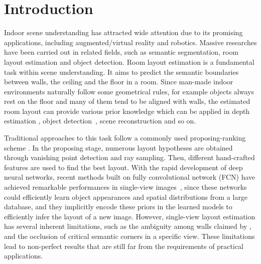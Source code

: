 \section{Introduction}

Indoor scene understanding has attracted wide attention due to its promising applications, including augmented/virtual reality and robotics. Massive researches have been carried out in related fields, such as semantic segmentation, room layout estimation and object detection. 
Room layout estimation is a fundamental task within scene understanding. It aims to predict the semantic boundaries between walls, the ceiling and the floor in a room. 
Since man-made indoor environments naturally follow some geometrical rules, for example objects always rest on the floor and many of them tend to be aligned with walls, the estimated room layout can provide various prior knowledge which can be applied in depth estimation \cite{eigen2014depth}, object detection~\cite{hedau2010thinking}, scene reconstruction \cite{lee2017joint} and so on.

Traditional approaches to this task follow a commonly used proposing-ranking scheme \cite{hedau2009recovering,wang2013discriminative,gupta2010estimating,hedau2010thinking}. In the proposing stage, numerous layout hypotheses are obtained through vanishing point detection and ray sampling. Then, different hand-crafted features are used to find the best layout. 
With the rapid development of deep neural networks, recent methods built on fully convolutional network (FCN) have achieved remarkable performances in single-view images~\cite{mallya2015learning,dasgupta2016delay,ren2016coarse,zhao2017physics,LeeRoomNet17,ICIP2018}, since these networks could efficiently learn object appearances and spatial distributions from a large database, and they implicitly encode these priors in the learned models to efficiently infer the layout of a new image. 
%
However, single-view layout estimation has several inherent limitations, such as the ambiguity among walls claimed by \cite{dasgupta2016delay}, and the occlusion of critical semantic corners in a specific view. These limitations lead to non-perfect results that are still far from the requirements of practical applications.

